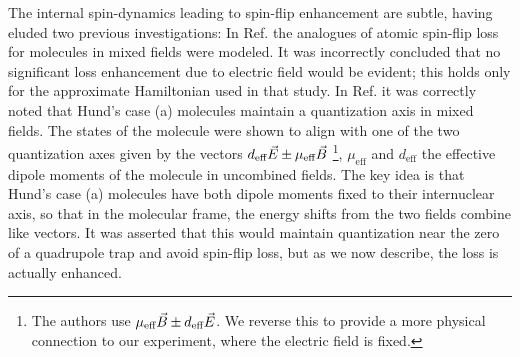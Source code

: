 \documentclass[%
 reprint,
 amsmath,amssymb,
 aps,
prl,
]{revtex4-1}
\newcommand{\s}{{\nobreak\hspace{.2em}}}
\begin{document}
The internal spin-dynamics leading to spin-flip enhancement are subtle, having eluded two previous investigations: 
In Ref.\s\cite{Lara2008} the analogues of atomic spin-flip loss for molecules in mixed fields were modeled. %
It was incorrectly concluded that no significant loss enhancement due to electric field would be evident; this holds only for the approximate Hamiltonian used in that study. 
In Ref.\s\cite{Bohn2013} it was correctly noted that Hund's case (a) molecules maintain a quantization axis in mixed fields. 
The states of the molecule were shown to align with one of the two quantization axes given by the vectors $d_\text{eff}\vec{E} \s {\pm}\s  \mu_\text{eff}\vec{B}$
\s\footnote{The authors use $\mu_\text{eff}\vec{B} \s {\pm}\s  d_\text{eff}\vec{E}$. We reverse this to provide a more physical connection to our experiment, where the electric field is fixed.}, 
$\mu_\text{eff}$ and $d_\text{eff}$ the effective dipole moments of the molecule in uncombined fields. 
The key idea is that Hund's case (a) molecules have both dipole moments fixed to their internuclear axis, so that in the molecular frame, the energy shifts from the two fields combine like vectors.
It was asserted that this would maintain quantization near the zero of a quadrupole trap and avoid spin-flip loss, but as we now describe, the loss is actually enhanced.

\end{document}
